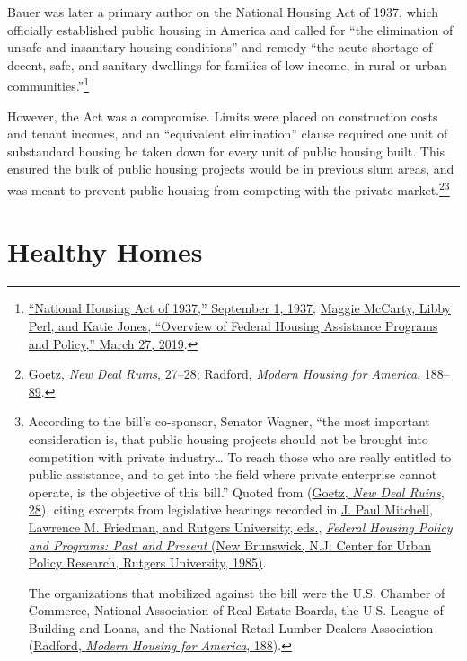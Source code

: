 \documentclass[
  openany]{book}
\begin{document}
Bauer was later a primary author on the National Housing Act of 1937, which officially established public housing in America and called for ``the elimination of unsafe and insanitary housing conditions'' and remedy ``the acute shortage of decent, safe, and sanitary dwellings for families of low-income, in rural or urban communities.''\footnote{\protect\hyperlink{ref-national1937}{{``National Housing Act of 1937,''} September 1, 1937}; \protect\hyperlink{ref-mccarty2019}{Maggie McCarty, Libby Perl, and Katie Jones, {``Overview of Federal Housing Assistance Programs and Policy,''} March 27, 2019}.}

However, the Act was a compromise. Limits were placed on construction costs and tenant incomes, and an ``equivalent elimination'' clause required one unit of substandard housing be taken down for every unit of public housing built. This ensured the bulk of public housing projects would be in previous slum areas, and was meant to prevent public housing from competing with the private market.\footnote{\protect\hyperlink{ref-goetz2013}{Goetz, \emph{New Deal Ruins}, 27--28}; \protect\hyperlink{ref-radford1996}{Radford, \emph{Modern Housing for America}, 188--89}.}\footnote{According to the bill's co-sponsor, Senator Wagner, ``the most important consideration is, that public housing projects should not be brought into competition with private industry\ldots{} To reach those who are really entitled to public assistance, and to get into the field where private enterprise cannot operate, is the objective of this bill.'' Quoted from (\protect\hyperlink{ref-goetz2013}{Goetz, \emph{New Deal Ruins}, 28}), citing excerpts from legislative hearings recorded in \protect\hyperlink{ref-federal1985}{J. Paul Mitchell, Lawrence M. Friedman, and Rutgers University, eds.}, \protect\hyperlink{ref-federal1985}{\emph{Federal Housing Policy and Programs: Past and Present} (New Brunswick, N.J: Center for Urban Policy Research, Rutgers University, 1985)}.

  The organizations that mobilized against the bill were the U.S. Chamber of Commerce, National Association of Real Estate Boards, the U.S. League of Building and Loans, and the National Retail Lumber Dealers Association (\protect\hyperlink{ref-radford1996}{Radford, \emph{Modern Housing for America}, 188}).}

\hypertarget{healthy-homes}{%
\section{Healthy Homes}\label{healthy-homes}}
\end{document}
